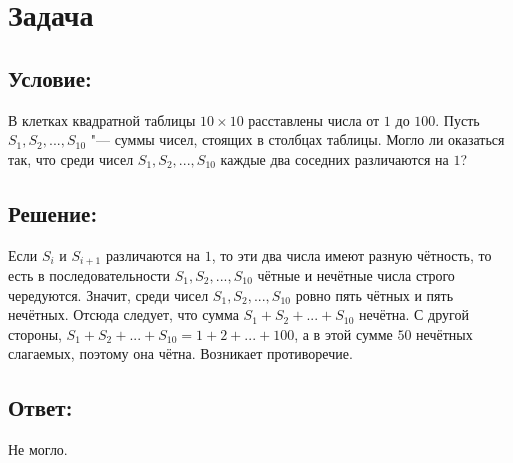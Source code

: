 \section{Задача}

\subsection*{Условие:}
В клетках квадратной таблицы $10 \times 10$ расставлены числа от $1$ до $100$. Пусть
$S_1, S_2, ..., S_{10}$ "--- суммы чисел, стоящих в столбцах таблицы. Могло ли оказаться так, что 
среди чисел $S_1, S_2, ..., S_{10}$ каждые два соседних различаются на $1$?

\subsection*{Решение:}
Если $S_i$ и $S_{i+1}$ различаются на $1$, то эти два числа имеют разную чётность, то есть в 
последовательности $S_1, S_2, ..., S_{10}$ чётные и нечётные числа строго чередуются. Значит, среди
чисел $S_1, S_2, ..., S_{10}$ ровно пять чётных и пять нечётных. Отсюда следует, что сумма
$S_1 + S_2 + ... + S_{10}$ нечётна. С другой стороны,
$S_1 + S_2 + ... + S_{10} = 1 + 2 + ... + 100$, а в этой сумме $50$ нечётных слагаемых, поэтому она
чётна. Возникает противоречие.

\subsection*{Ответ:}
Не могло.